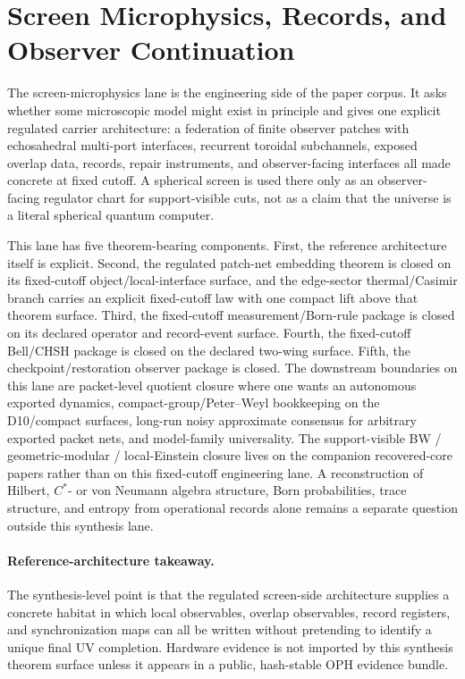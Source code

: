 \section{Screen Microphysics, Records, and Observer Continuation}

The screen-microphysics lane is the engineering side of the paper corpus. It asks
whether some microscopic model might exist in principle and gives one explicit regulated
carrier architecture: a federation of finite observer patches with echosahedral multi-port
interfaces, recurrent toroidal subchannels, exposed overlap data, records, repair instruments,
and observer-facing interfaces all made concrete at fixed cutoff. A spherical screen is used
there only as an observer-facing regulator chart for support-visible cuts, not as a claim that
the universe is a literal spherical quantum computer.

This lane has five theorem-bearing components. First, the reference architecture itself is
explicit. Second, the regulated patch-net embedding theorem is closed on its fixed-cutoff
object/local-interface surface, and the edge-sector thermal/Casimir branch carries an explicit
fixed-cutoff law with one compact lift above that theorem surface.
Third, the fixed-cutoff measurement/Born-rule package is closed on its declared operator and
record-event surface. Fourth, the fixed-cutoff
Bell/CHSH package is closed on the declared two-wing surface. Fifth, the
checkpoint/restoration observer package is closed. The downstream boundaries on this lane are
packet-level quotient closure where one wants an autonomous exported dynamics,
compact-group/Peter--Weyl bookkeeping on the D10/compact surfaces, long-run noisy approximate
consensus for arbitrary exported packet nets, and model-family universality. The
support-visible BW / geometric-modular / local-Einstein closure lives on the companion recovered-core
papers rather than on this fixed-cutoff engineering lane. A reconstruction of Hilbert, \(C^*\)- or von Neumann algebra
structure, Born probabilities, trace structure, and entropy from operational records alone remains
a separate question outside this synthesis lane.

\paragraph{Reference-architecture takeaway.}
The synthesis-level point is that the regulated screen-side architecture supplies a concrete
habitat in which local observables, overlap observables, record registers, and synchronization
maps can all be written without pretending to identify a unique final UV completion. Hardware
evidence is not imported by this synthesis theorem surface unless it appears in a public,
hash-stable OPH evidence bundle.

